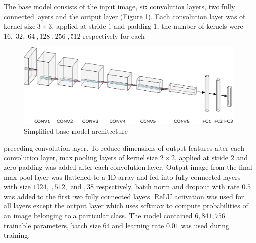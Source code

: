 \documentclass{beamer}
\begin{document}
\begin{frame}[allowframebreaks]
\begin{figure}[H]
\end{figure} 
The base model consists of the input image, six convolution layers, two fully connected layers and the output layer (Figure \ref{fig:cnn_arch}). Each convolution layer was of kernel size $3 \times 3$, applied at stride $1$ and padding $1$, the number of kernels were $16,\;32,\;64\;,128\;,256\;,512$ respectively for each 
\begin{figure}[H]
\centering
\includegraphics[scale=0.3]{png/drawing_nn.png}
\caption{Simplified base model architecture}
\label{fig:cnn_arch}
\end{figure} 
preceding convolution layer. To reduce dimensions of output features after each convolution layer, max pooling layers of kernel size $2 \times 2$, applied at stride $2$ and zero padding was added after each convolution layer. Output image from the final max pool layer was flattened to a $1$D array and fed into fully connected layers with size $1024, \;, 512, \text{ and }, 38$ respectively, batch norm and dropout with rate $0.5$ was added to the first two fully connected layers. ReLU activation was used for all layers except the output layer which uses softmax to compute probabilities of an image belonging to a particular class. The model contained $6,841,766$ trainable parameters, batch size $64$ and learning rate $0.01$ was used during training. 
\end{frame}
\end{document}
